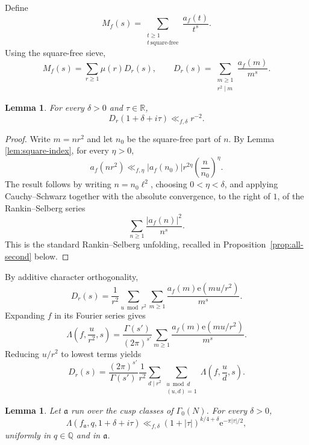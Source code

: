 \documentclass[10pt,a4paper]{amsart}
\newtheorem{lemma}[theorem]{Lemma}
\newcommand{\e}{\mathrm{e}}
\newcommand{\R}{\mathbb R}
\newcommand{\Q}{\mathbb Q}
\begin{document}
Define
\[
M_f(s)=\sum_{\substack{t\ge1\\t\ \mathrm{square\text{-}free}}}\frac{a_f(t)}{t^s}.
\]
Using the square-free sieve,
\[
M_f(s)=\sum_{r\ge1}\mu(r)D_r(s),
\qquad
D_r(s)=\sum_{\substack{m\ge1\\r^2\mid m}}\frac{a_f(m)}{m^s}.
\tag{3.2}
\]

\begin{lemma}\label{lem:right-bound}
For every $\delta>0$ and $\tau\in\R$,
\[
D_r(1+\delta+i\tau)\ll_{f,\delta}r^{-2}.
\]
\end{lemma}

\begin{proof}
Write $m=nr^2$ and let $n_0$ be the square-free part of $n$. By Lemma \ref{lem:square-index}, for every $\eta>0$,
\[
a_f(nr^2)\ll_{f,\eta}|a_f(n_0)|r^{2\eta}\left(\frac n{n_0}\right)^\eta.
\]
The result follows by writing $n=n_0\ell^2$, choosing $0<\eta<\delta$, and applying Cauchy--Schwarz together with the absolute convergence, to the right of $1$, of the Rankin--Selberg series
\[
\sum_{n\ge1}\frac{|a_f(n)|^2}{n^s}.
\]
This is the standard Rankin--Selberg unfolding, recalled in
Proposition~\ref{prop:all-second} below.
\end{proof}

By additive character orthogonality,
\[
D_r(s)=\frac1{r^2}\sum_{u\bmod r^2}
\sum_{m\ge1}\frac{a_f(m)\e(mu/r^2)}{m^s}.
\tag{3.3}
\]
Expanding $f$ in its Fourier series gives
\[
\Lambda\left(f,\frac{u}{r^2},s\right)
=\frac{\Gamma(s')}{(2\pi)^{s'}}
\sum_{m\ge1}\frac{a_f(m)\e(mu/r^2)}{m^s}.
\]
Reducing $u/r^2$ to lowest terms yields
\[
D_r(s)=\frac{(2\pi)^{s'}}{\Gamma(s')}\frac1{r^2}
\sum_{d\mid r^2}\sum_{\substack{u\bmod d\\(u,d)=1}}
\Lambda\left(f,\frac ud,s\right).
\tag{3.4}
\]

\begin{lemma}\label{lem:cusp-uniform}
Let $\mathfrak a$ run over the cusp classes of $\Gamma_0(N)$. For every $\delta>0$,
\[
\Lambda(f_{\mathfrak a},q,1+\delta+i\tau)
\ll_{f,\delta}(1+|\tau|)^{k/4+\delta}\e^{-\pi|\tau|/2},
\]
uniformly in $q\in\Q$ and in $\mathfrak a$.
\end{lemma}
\end{document}
